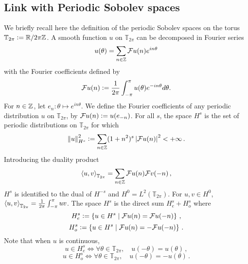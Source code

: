 \documentclass[a4paper]{article}
\begin{document}
\subsection{Link with Periodic Sobolev spaces}
We briefly recall here the definition of the periodic Sobolev spaces on the torus $\mathbb{T}_{2\pi} \mathrel{\mathop:}= \mathbb{R} / 2\pi \mathbb{Z}$. A smooth function $u$ on $\mathbb{T}_{2\pi}$ can be decomposed in Fourier series 
\[u(\theta) = \sum_{n \in \mathbb{Z}} \mathcal{F}u(n) e^{in\theta}\]
with the Fourier coefficients defined by 
\[\mathcal{F}u(n) \mathrel{\mathop:}= \frac{1}{2\pi}\int_{-\pi}^\pi u(\theta) e^{-in\theta}d\theta.\]
For $n\in \mathbb{Z}$, let $e_n : \theta \mapsto e^{in\theta}$. We define the Fourier coefficients of any periodic distribution $u$ on $\mathbb{T}_{2\pi}$, by $\mathcal{F}u(n) \mathrel{\mathop:}= u(e_{-n})$. For all $s$, the space $H^s$ is the set of periodic distributions on $\mathbb{T}_{2\pi}$ for which 
\[\left\|u\right\|_{H^s}^2 \mathrel{\mathop:}= \sum_{n \in \mathbb{Z}} (1 + n^{2})^s\left\lvert \mathcal{F}u(n) \right\rvert^2 < +\infty\,. \]
Introducing the duality product
\begin{equation}
\label{dualiteSobolevPer}
\left\langle u,v\right\rangle_{\mathbb{T}_{2\pi}} = \sum_{n \in \mathbb{Z}} \mathcal{F}u(n) \mathcal{F}v(-n)\,,
\end{equation}
$H^s$ is identified to the dual of $H^{-s}$ and $H^0 = L^2(\mathbb{T}_{2\pi})$. For $u,v \in  H^0$, $\left\langle u,v\right\rangle_{\mathbb{T}_{2\pi}} = \frac{1}{2\pi} \int_{-\pi}^{\pi} uv$. The space $H^s$ is the direct sum $H^s_e + H^s_o$ where 
\[H^s_e \mathrel{\mathop:}= \left\{u \in H^s\mathrel{}\middle|\mathrel{}\mathcal{F}u(n) = \mathcal{F}u(-n)\right\}\,,\]
\[H^s_o \mathrel{\mathop:}= \left\{u \in H^s\mathrel{}\middle|\mathrel{}\mathcal{F}u(n) = -\mathcal{F}u(-n)\right\}\,.\]
Note that when $u$ is continuous, 
\[u \in H^s_e \iff \forall \theta \in \mathbb{T}_{2\pi}, \quad u(-\theta) = u(\theta)\,,\]
\[u \in H^s_o \iff \forall \theta \in \mathbb{T}_{2\pi}, \quad u(-\theta) = -u(\theta)\,.\] 
\end{document}
